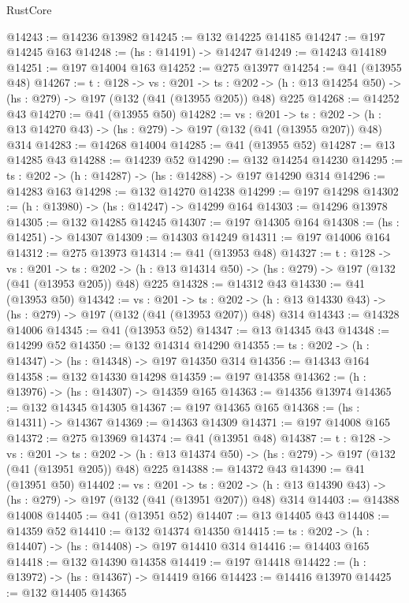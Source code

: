 \begin{lexlean}{RustCore}
\begin{coremodule}
@14243 := @14236 @13982
@14245 := @132 @14225 @14185
@14247 := @197 @14245 @163
@14248 := (hs : @14191) -> @14247
@14249 := @14243 @14189
@14251 := @197 @14004 @163
@14252 := @275 @13977
@14254 := @41 (@13955 @48)
@14267 := {t : @128} ->
  {vs : @201} ->
  {ts : @202} -> (h : @13 @14254 @50) -> (hs : @279) -> @197 (@132 (@41 (@13955 @205)) @48) @225
@14268 := @14252 @43
@14270 := @41 (@13955 @50)
@14282 := {vs : @201} ->
  {ts : @202} -> (h : @13 @14270 @43) -> (hs : @279) -> @197 (@132 (@41 (@13955 @207)) @48) @314
@14283 := @14268 @14004
@14285 := @41 (@13955 @52)
@14287 := @13 @14285 @43
@14288 := @14239 @52
@14290 := @132 @14254 @14230
@14295 := {ts : @202} -> (h : @14287) -> (hs : @14288) -> @197 @14290 @314
@14296 := @14283 @163
@14298 := @132 @14270 @14238
@14299 := @197 @14298
@14302 := (h : @13980) -> (hs : @14247) -> @14299 @164
@14303 := @14296 @13978
@14305 := @132 @14285 @14245
@14307 := @197 @14305 @164
@14308 := (hs : @14251) -> @14307
@14309 := @14303 @14249
@14311 := @197 @14006 @164
@14312 := @275 @13973
@14314 := @41 (@13953 @48)
@14327 := {t : @128} ->
  {vs : @201} ->
  {ts : @202} -> (h : @13 @14314 @50) -> (hs : @279) -> @197 (@132 (@41 (@13953 @205)) @48) @225
@14328 := @14312 @43
@14330 := @41 (@13953 @50)
@14342 := {vs : @201} ->
  {ts : @202} -> (h : @13 @14330 @43) -> (hs : @279) -> @197 (@132 (@41 (@13953 @207)) @48) @314
@14343 := @14328 @14006
@14345 := @41 (@13953 @52)
@14347 := @13 @14345 @43
@14348 := @14299 @52
@14350 := @132 @14314 @14290
@14355 := {ts : @202} -> (h : @14347) -> (hs : @14348) -> @197 @14350 @314
@14356 := @14343 @164
@14358 := @132 @14330 @14298
@14359 := @197 @14358
@14362 := (h : @13976) -> (hs : @14307) -> @14359 @165
@14363 := @14356 @13974
@14365 := @132 @14345 @14305
@14367 := @197 @14365 @165
@14368 := (hs : @14311) -> @14367
@14369 := @14363 @14309
@14371 := @197 @14008 @165
@14372 := @275 @13969
@14374 := @41 (@13951 @48)
@14387 := {t : @128} ->
  {vs : @201} ->
  {ts : @202} -> (h : @13 @14374 @50) -> (hs : @279) -> @197 (@132 (@41 (@13951 @205)) @48) @225
@14388 := @14372 @43
@14390 := @41 (@13951 @50)
@14402 := {vs : @201} ->
  {ts : @202} -> (h : @13 @14390 @43) -> (hs : @279) -> @197 (@132 (@41 (@13951 @207)) @48) @314
@14403 := @14388 @14008
@14405 := @41 (@13951 @52)
@14407 := @13 @14405 @43
@14408 := @14359 @52
@14410 := @132 @14374 @14350
@14415 := {ts : @202} -> (h : @14407) -> (hs : @14408) -> @197 @14410 @314
@14416 := @14403 @165
@14418 := @132 @14390 @14358
@14419 := @197 @14418
@14422 := (h : @13972) -> (hs : @14367) -> @14419 @166
@14423 := @14416 @13970
@14425 := @132 @14405 @14365

\end{coremodule}
\end{lexlean}
